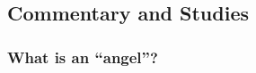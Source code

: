 

	
	
	
	
\subsection{Commentary and Studies} %
	\label{ANGEL-COMMENTARY}

	
		
	\subsubsection{What is an ``angel''?}
		\label{ANGEL-definition}
		
